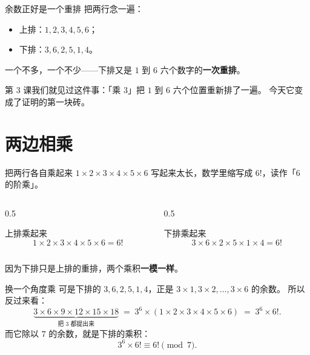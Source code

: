\documentclass[10pt]{beamer}
\begin{document}
\begin{frame}{余数正好是一个重排}
  把两行念一遍：
  \begin{itemize}
    \item 上排：\(1,2,3,4,5,6\)；
    \item 下排：\(3,6,2,5,1,4\)。
  \end{itemize}
  \pause
  \begin{center}
    {\large 一个不多，一个不少——下排又是 \(1\) 到 \(6\) 六个数字的\textbf{一次重排}。}
  \end{center}
  \pause
  \begin{zhu}
    第 3 课我们就见过这件事：「乘 \(3\)」把 \(1\) 到 \(6\) 六个位置重新排了一遍。
    今天它变成了证明的第一块砖。
  \end{zhu}
\end{frame}

\section{两边相乘}

\begin{frame}{把两行各自乘起来}
  \(1\times2\times3\times4\times5\times6\) 写起来太长，数学里缩写成 \(6!\)，读作「\(6\) 的阶乘」。
  \begin{columns}[T]
    \begin{column}{0.5\textwidth}
      \begin{block}{上排乘起来}
        \[
          1\times2\times3\times4\times5\times6=6!
        \]
      \end{block}
    \end{column}
    \begin{column}{0.5\textwidth}
      \begin{block}{下排乘起来}
        \[
          3\times6\times2\times5\times1\times4=6!
        \]
      \end{block}
    \end{column}
  \end{columns}
  \pause
  \begin{center}
    因为下排只是上排的重排，两个乘积\textbf{一模一样}。
  \end{center}
\end{frame}

\begin{frame}{换一个角度乘}
  可是下排的 \(3,6,2,5,1,4\)，正是 \(3\times1,3\times2,\dots,3\times6\) 的余数。
  \pause
  所以反过来看：
  \[
    \underbrace{3\times6\times9\times12\times15\times18}_{\text{把 }3\text{ 都提出来}}
    \;=\;
    3^{6}\times(1\times2\times3\times4\times5\times6)
    \;=\;
    3^{6}\times 6! .
  \]
  \pause
  而它除以 \(7\) 的余数，就是下排的乘积：
  \[
    3^{6}\times6!\equiv 6! \pmod 7 .
  \]
\end{frame}
\end{document}
